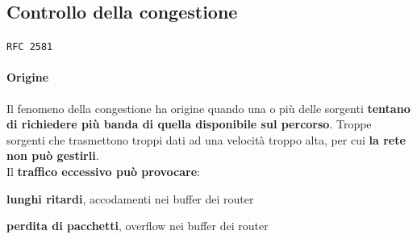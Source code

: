 \documentclass[10pt]{article}
\begin{document}
\subsection{Controllo della congestione}
\texttt{RFC 2581}
\paragraph{Origine} Il fenomeno della congestione ha origine quando una o più delle sorgenti \textbf{tentano di richiedere più banda di quella disponibile sul percorso}. Troppe sorgenti che trasmettono troppi dati ad una velocità troppo alta, per cui \textbf{la rete non può gestirli}.\\
Il \textbf{traffico eccessivo può provocare}:
\begin{list}{}{}
\item \textbf{lunghi ritardi}, accodamenti nei buffer dei router
\item \textbf{perdita di pacchetti}, overflow nei buffer dei router
\end{list}
\end{document}
